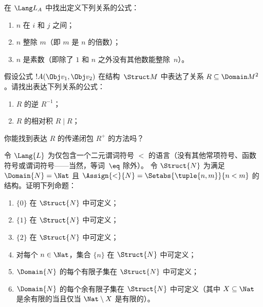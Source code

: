 \documentclass[../../../include/open-logic-section]{subfiles}
\begin{document}
\begin{prob}
在 $\Lang L_A$ 中找出定义下列关系的公式：
\begin{enumerate}
\item $n$ 在 $i$ 和 $j$ 之间；
\item $n$ 整除 $m$（即 $m$ 是 $n$ 的倍数）；
\item $n$ 是素数（即除了 $1$ 和 $n$ 之外没有其他数能整除~$n$）。
\end{enumerate}
\end{prob}

\begin{prob}
假设公式 $!A(\Obj v_1, \Obj v_2)$ 在结构~$\Struct M$ 中表达了关系 $R \subseteq \Domain M^2$。请找出表达下列关系的公式：
\begin{enumerate}
\item $R$ 的逆 $R^{-1}$；
\item $R$ 的相对积 $R \mid R$；
\end{enumerate}
你能找到表达 $R$ 的传递闭包 $R^+$ 的方法吗？
\end{prob}

\begin{prob}
令 $\Lang{L}$ 为仅包含一个二元谓词符号 $<$ 的语言（没有其他常项符号、函数符号或谓词符号——当然，等词~$\eq$ 除外）。
令 $\Struct{N}$ 为满足 $\Domain{N} = \Nat$ 且 $\Assign{<}{N} = \Setabs{\tuple{n,m}}{n <
  m}$ 的结构。证明下列命题：
\begin{enumerate}
\item $\{ 0 \}$ 在 $\Struct{N}$ 中可定义；
\item $\{ 1 \}$ 在 $\Struct{N}$ 中可定义；
\item $\{ 2 \}$ 在 $\Struct{N}$ 中可定义；
\item 对每个 $n \in \Nat$，集合 $\{ n \}$ 在 $\Struct{N}$ 中可定义；
\item $\Domain{N}$ 的每个有限子集在 $\Struct{N}$ 中可定义；
\item $\Domain{N}$ 的每个余有限子集在 $\Struct{N}$ 中可定义（其中 $X \subseteq \Nat$ 是余有限的当且仅当 $\Nat \setminus X$ 是有限的）。
\end{enumerate}
\end{prob}
\end{document}
